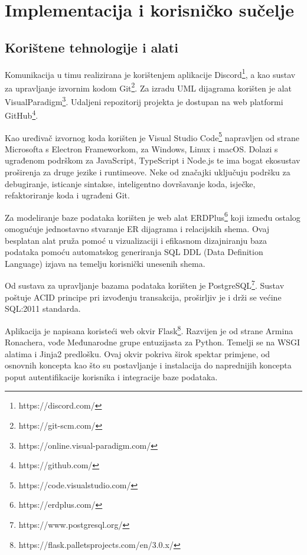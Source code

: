 \chapter{Implementacija i korisničko sučelje}
		
		
		\section{Korištene tehnologije i alati}
		
			 Komunikacija u timu realizirana je korištenjem aplikacije Discord\footnote{https://discord.com/}, a kao sustav za upravljanje izvornim kodom Git\footnote{https://git-scm.com/}. Za izradu UML dijagrama korišten je alat VisualParadigm\footnote{https://online.visual-paradigm.com/}. Udaljeni repozitorij projekta je dostupan na web platformi GitHub\footnote{https://github.com/}.
			 
			 Kao uređivač izvornog koda korišten je Visual Studio Code\footnote{https://code.visualstudio.com/} napravljen od strane Microsofta s Electron Frameworkom, za Windows, Linux i macOS. Dolazi s ugrađenom podrškom za JavaScript, TypeScript i Node.js te ima bogat ekosustav proširenja za druge jezike i runtimeove. Neke od značajki uključuju podršku za debugiranje, isticanje sintakse, inteligentno dovršavanje koda, isječke, refaktoriranje koda i ugrađeni Git.
			 
			 Za modeliranje baze podataka korišten je web alat ERDPlus\footnote{https://erdplus.com/} koji između ostalog omogućuje jednostavno stvaranje ER dijagrama i relacijskih shema. Ovaj besplatan alat pruža pomoć u vizualizaciji i efikasnom dizajniranju baza podataka pomoću automatskog generiranja SQL DDL (Data Definition Language) izjava na temelju korisnički unesenih shema.
             
			 Od sustava za upravljanje bazama podataka korišten je PostgreSQL\footnote{ https://www.postgresql.org/}. Sustav poštuje ACID principe pri izvođenju transakcija, proširljiv je i drži se većine SQL:2011 standarda.
			 
			 Aplikacija je napisana koristeći web okvir Flask\footnote{https://flask.palletsprojects.com/en/3.0.x/}. Razvijen je od strane Armina Ronachera, vođe Međunarodne grupe entuzijasta za Python. Temelji se na WSGI alatima i Jinja2 predlošku. Ovaj okvir pokriva širok spektar primjene, od osnovnih koncepta kao što su postavljanje i instalacija do naprednijih koncepta poput autentifikacije korisnika i integracije baze podataka.
			 
